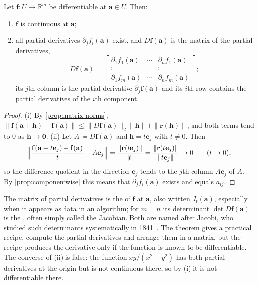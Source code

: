 \begin{theorem}
\label{thm:jacobian}
Let $\mathbf f\colon U\to\mathbb R^m$ be differentiable at $\mathbf a\in U$. Then:
\begin{enumerate}
\item $\mathbf f$ is continuous at $\mathbf a$;
\item all partial derivatives $\partial_jf_i(\mathbf a)$ exist, and $D\mathbf f(\mathbf a)$ is the matrix of the partial derivatives,
\[
D\mathbf f(\mathbf a)=\begin{bmatrix}\partial_1f_1(\mathbf a)&\cdots&\partial_nf_1(\mathbf a)\\\vdots&&\vdots\\\partial_1f_m(\mathbf a)&\cdots&\partial_nf_m(\mathbf a)\end{bmatrix};
\]
its $j$th column is the partial derivative $\partial_j\mathbf f(\mathbf a)$ and its $i$th row contains the partial derivatives of the $i$th component.
\end{enumerate}
\end{theorem}

\begin{proof}
(i) By \cref{prop:matrix-norms}, $\|\mathbf f(\mathbf a+\mathbf h)-\mathbf f(\mathbf a)\|\le\|D\mathbf f(\mathbf a)\|_2\|\mathbf h\|+\|\mathbf r(\mathbf h)\|$, and both terms tend to $0$ as $\mathbf h\to\mathbf0$. (ii) Let $A\coloneqq D\mathbf f(\mathbf a)$ and $\mathbf h=t\mathbf e_j$ with $t\ne0$. Then
\[
\Bigl\|\frac{\mathbf f(\mathbf a+t\mathbf e_j)-\mathbf f(\mathbf a)}t-A\mathbf e_j\Bigr\|=\frac{\|\mathbf r(t\mathbf e_j)\|}{|t|}=\frac{\|\mathbf r(t\mathbf e_j)\|}{\|t\mathbf e_j\|}\to0\qquad(t\to0),
\]
so the difference quotient in the direction $\mathbf e_j$ tends to the $j$th column $A\mathbf e_j$ of $A$. By \cref{prop:componentwise} this means that $\partial_jf_i(\mathbf a)$ exists and equals $a_{ij}$.
\end{proof}

The matrix of partial derivatives is the  of $\mathbf f$ at $\mathbf a$, also written $J_{\mathbf f}(\mathbf a)$, especially when it appears as data in an algorithm; for $m=n$ its determinant $\det D\mathbf f(\mathbf a)$ is the , often simply called the Jacobian. Both are named after Jacobi, who studied such determinants systematically in 1841~\cite{jacobi1841}. The theorem gives a practical recipe, compute the partial derivatives and arrange them in a matrix, but the recipe produces the derivative only if the function is known to be differentiable. The converse of (ii) is false: the function $xy/(x^2+y^2)$ has both partial derivatives at the origin but is not continuous there, so by (i) it is not differentiable there.

